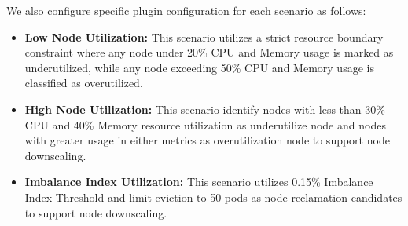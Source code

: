 \begin{table}[H]
    \centering
    \caption{Experimental Matrix Mapping for Latency and Defragmentation Trade-off Test}
    \label{tab:netaware4_experimentalmatrix}
\end{table}

We also configure specific plugin configuration for each scenario as follows:

\begin{itemize}
    \item \textbf{Low Node Utilization:} This scenario utilizes a strict resource boundary constraint where any node under 20\% CPU and Memory usage is marked as underutilized, while any node exceeding 50\% CPU and Memory usage is classified as overutilized.

    \item \textbf{High Node Utilization:} This scenario identify nodes with less than 30\% CPU and 40\% Memory resource utilization as underutilize node and nodes with greater usage in either metrics as overutilization node to support node downscaling.

    \item \textbf{Imbalance Index Utilization:} This scenario utilizes 0.15\% Imbalance Index Threshold and limit eviction to 50 pods as node reclamation candidates to support node downscaling.
\end{itemize}

